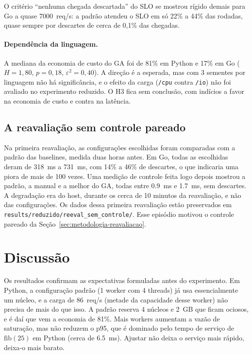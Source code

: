 \documentclass[11pt,a4paper]{article}
\begin{document}
O critério ``nenhuma chegada descartada'' do SLO se mostrou rígido demais para Go a quase \SI{7000}{req/s}: a padrão
atendeu o SLO em só 22\% a 44\% das rodadas, quase sempre por descartes de cerca de 0,1\% das chegadas.

\paragraph{Dependência da linguagem.} A mediana da economia de custo do GA foi de 81\% em Python e 17\% em Go
($H = 1{,}80$, $p = 0{,}18$, $\varepsilon^2 = 0{,}40$). A direção é a esperada, mas com 3 sementes por linguagem não há
significância, e o efeito da carga (\texttt{/cpu} contra \texttt{/io}) não foi avaliado no experimento reduzido. O H3 fica
sem conclusão, com indícios a favor na economia de custo e contra na latência.

\subsection{A reavaliação sem controle pareado}
\label{sec:sem-controle}

Na primeira reavaliação, as configurações escolhidas foram comparadas com a padrão das baselines, medida duas horas
antes. Em Go, todas as escolhidas deram de \SI{318}{ms} a \SI{731}{ms}, com 14\% a 46\% de descartes, o que
indicaria uma piora de mais de 100 vezes. Uma medição de controle feita logo depois mostrou a padrão, a manual e a
melhor do GA, todas entre \SI{0,9}{ms} e \SI{1,7}{ms}, sem descartes. A degradação era do host, durante os cerca de 10
minutos da reavaliação, e não das configurações. Os dados dessa primeira reavaliação estão preservados em
\texttt{results/reduzido/reeval\_sem\_controle/}. Esse episódio motivou o controle pareado da Seção~\ref{sec:metodologia-reavaliacao}.

\section{Discussão}

Os resultados confirmam as expectativas formuladas antes do experimento. Em Python, a configuração padrão (1 worker com
4 threads) já usa essencialmente um núcleo, e a carga de \SI{86}{req/s} (metade da capacidade desse worker) não precisa
de mais do que isso. A padrão reserva 4 núcleos e \SI{2}{GB} que ficam ociosos, e é daí que vem a economia de 81\%.
Mais workers aumentam a vazão de saturação, mas não reduzem o p95, que é dominado pelo tempo de serviço de
$\mathrm{fib}(25)$ em Python (cerca de \SI{6,5}{ms}). Ajustar não deixa o serviço mais rápido, deixa-o mais barato.
\end{document}
